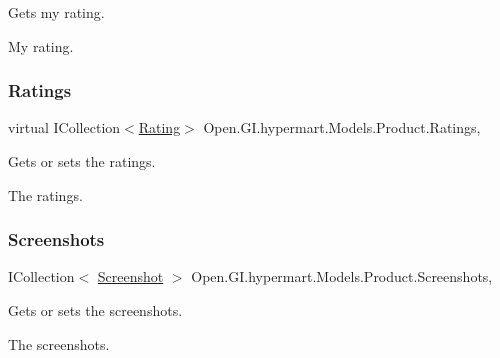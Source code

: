 Gets my rating. 

My rating. \hypertarget{class_open_1_1_g_i_1_1hypermart_1_1_models_1_1_product_a7e60500876b53ff5597ccae7f88e1d5e}{}\label{class_open_1_1_g_i_1_1hypermart_1_1_models_1_1_product_a7e60500876b53ff5597ccae7f88e1d5e} 
\subsubsection{\texorpdfstring{Ratings}{Ratings}}
{\footnotesize\ttfamily virtual I\+Collection$<$\hyperlink{class_open_1_1_g_i_1_1hypermart_1_1_models_1_1_rating}{Rating}$>$ Open.\+G\+I.\+hypermart.\+Models.\+Product.\+Ratings\hspace{0.3cm}{\ttfamily [get]}, {\ttfamily [set]}}



Gets or sets the ratings. 

The ratings. \hypertarget{class_open_1_1_g_i_1_1hypermart_1_1_models_1_1_product_a5fae1aafb8f9a3af27ce369d5d053df1}{}\label{class_open_1_1_g_i_1_1hypermart_1_1_models_1_1_product_a5fae1aafb8f9a3af27ce369d5d053df1} 
\subsubsection{\texorpdfstring{Screenshots}{Screenshots}}
{\footnotesize\ttfamily I\+Collection$<$ \hyperlink{class_open_1_1_g_i_1_1hypermart_1_1_models_1_1_screenshot}{Screenshot} $>$ Open.\+G\+I.\+hypermart.\+Models.\+Product.\+Screenshots\hspace{0.3cm}{\ttfamily [get]}, {\ttfamily [set]}}



Gets or sets the screenshots. 

The screenshots. \hypertarget{class_open_1_1_g_i_1_1hypermart_1_1_models_1_1_product_ab5fd5620220d0e68053208859137a6cb}{}\label{class_open_1_1_g_i_1_1hypermart_1_1_models_1_1_product_ab5fd5620220d0e68053208859137a6cb} 
